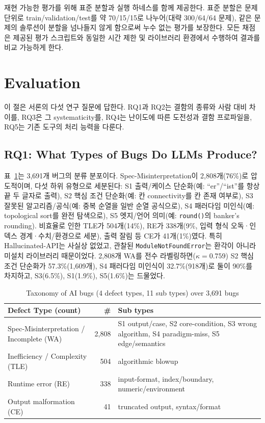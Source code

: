 \documentclass[10pt,conference]{IEEEtran}
\begin{document}
재현 가능한 평가를 위해 표준 분할과 실행 하네스를 함께 제공한다. 표준 분할은 문제 단위로 train/validation/test를 약 70/15/15로 나누어(대략 300/64/64 문제), 같은 문제의 솔루션이 분할을 넘나들지 않게 함으로써 누수 없는 평가를 보장한다. 모든 채점은 제공된 평가 스크립트와 동일한 시간 제한 및 라이브러리 환경에서 수행하여 결과를 비교 가능하게 한다.

\section{Evaluation}
이 절은 서론의 다섯 연구 질문에 답한다. RQ1과 RQ2는 결함의 종류와 사람 대비 차이를, RQ3은 그 systematicity를, RQ4는 난이도에 따른 도전성과 결함 프로파일을, RQ5는 기존 도구의 처리 능력을 다룬다.

\subsection{RQ1: What Types of Bugs Do LLMs Produce?}
표~\ref{tab:taxonomy}는 3{,}691개 버그의 분류 분포이다. Spec-Misinterpretation이 2{,}808개(76\%)로 압도적이며, 다섯 하위 유형으로 세분된다: S1 출력/케이스 단순화(예: ``er''/``ist''를 항상 끝 두 글자로 출력), S2 핵심 조건 단순화(예: 칸 connectivity를 칸 존재 여부로), S3 잘못된 알고리즘/공식(예: 중복 순열을 일반 순열 공식으로), S4 패러다임 미인식(예: topological sort를 완전 탐색으로), S5 엣지/언어 의미(예: \texttt{round()}의 banker's rounding). 비효율로 인한 TLE가 504개(14\%), RE가 338개(9\%, 입력 형식 오독·인덱스 경계·수치/환경으로 세분), 출력 잘림 등 CE가 41개(1\%)였다. 특히 Hallucinated-API는 사실상 없었고, 관찰된 \texttt{ModuleNotFoundError}는 환각이 아니라 미설치 라이브러리 때문이었다. 2{,}808개 WA를 전수 라벨링하면($\kappa=0.759$) S2 핵심 조건 단순화가 57.3\%(1{,}609개), S4 패러다임 미인식이 32.7\%(918개)로 둘이 90\%를 차지하고, S3(6.5\%), S1(1.9\%), S5(1.6\%)는 드물었다.

\begin{table}[t]
\caption{Taxonomy of AI bugs (4 defect types, 11 sub types) over 3{,}691 bugs}
\label{tab:taxonomy}
\centering
\footnotesize
\begin{tabular}{p{2.7cm}rp{3.4cm}}
\toprule
Defect Type (count) & \# & Sub types \\
\midrule
Spec-Misinterpretation / Incomplete (WA) & 2{,}808 & S1 output/case, S2 core-condition, S3 wrong algorithm, S4 paradigm-miss, S5 edge/semantics \\
Inefficiency / Complexity (TLE) & 504 & algorithmic blowup \\
Runtime error (RE) & 338 & input-format, index/boundary, numeric/environment \\
Output malformation (CE) & 41 & truncated output, syntax/format \\
\bottomrule
\end{tabular}
\end{table}
\end{document}
